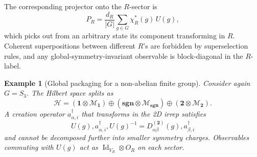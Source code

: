 \documentclass[12pt,a4paper]{article}
\newtheorem{example}{Example}
\begin{document}
The corresponding projector onto the $R$-sector is
$$
P_R
= \frac{d_R}{|G|}\sum_{g\in G} \chi_R^*(g)\,U(g),
$$
which picks out from an arbitrary state its component transforming in $R$.
Coherent superpositions between different $R$’s are forbidden by superselection rules, and any global-symmetry-invariant observable is block-diagonal in the $R$-label.

\begin{example}[Global packaging for a non-abelian finite group]
	Consider again $G=S_3$.
	The Hilbert space splits as	
	$$
	\mathcal H = (\mathbf1\otimes\mathcal M_{\mathbf1})\oplus(\mathbf{sgn}\otimes\mathcal M_{\mathbf{sgn}})\oplus(\mathbf2\otimes\mathcal M_{\mathbf2}).
	$$	
	A creation operator $a_{\alpha,i}^\dagger$ that transforms in the 2D irrep satisfies	
	$$U(g),a_{\alpha,i}^\dagger,U(g)^{-1} = D_{\alpha\beta}^{(\mathbf2)}(g),a_{\beta,i}^\dagger
	$$	
	and cannot be decomposed further into smaller symmetry charges.
	Observables commuting with $U(g)$ act as $\operatorname{Id}_{V_R}\otimes O_R$ on each sector.
\end{example}
\end{document}
